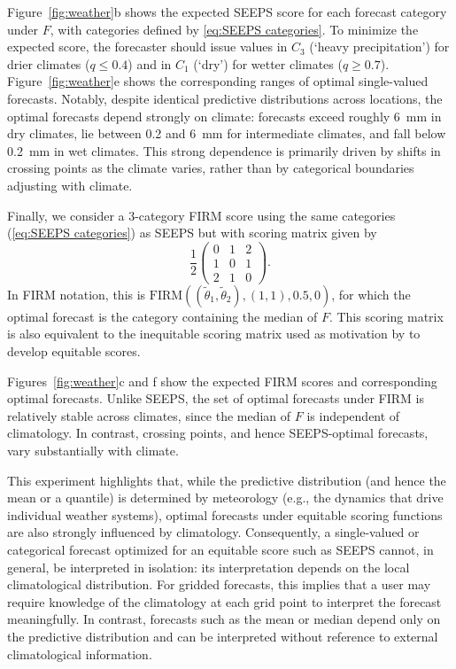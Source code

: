 \documentclass[10pt]{article} %
\theoremstyle{theorem}
\theoremstyle{definition}
\begin{document}
Figure~\ref{fig:weather}b shows the expected SEEPS score for each forecast category under $F$, with categories defined by \eqref{eq:SEEPS categories}. To minimize the expected score, the forecaster should issue values in $C_3$ (`heavy precipitation') for drier climates ($q\leq 0.4$) and in $C_1$ (`dry') for wetter climates ($q\geq0.7$). Figure~\ref{fig:weather}e shows the corresponding ranges of optimal single-valued forecasts. Notably, despite identical predictive distributions across locations, the optimal forecasts depend strongly on climate: forecasts exceed roughly 6~mm in dry climates, lie between 0.2 and 6~mm for intermediate climates, and fall below 0.2~mm in wet climates. This strong dependence is primarily driven by shifts in crossing points as the climate varies, rather than by categorical boundaries adjusting with climate.

Finally, we consider a 3-category FIRM score \citep{taggart2022scoring} using the same categories (\ref{eq:SEEPS categories}) as SEEPS but with scoring matrix given by
\begin{equation}\label{eq:FIRM matrix}
\frac{1}{2}\begin{pmatrix}
0 & 1 & 2 \\
1 & 0 & 1 \\
2 & 1 & 0
\end{pmatrix}.
\end{equation}
In FIRM notation, this is $\mathrm{FIRM}((\tilde{\theta}_1,\tilde{\theta}_2), (1, 1), 0.5, 0)$, for which the optimal forecast is the category containing the median of $F$. This scoring matrix is also equivalent to the inequitable scoring matrix used as motivation by \citet[Section~3]{gandin1992equitable} to develop equitable scores.

Figures~\ref{fig:weather}c and f show the expected FIRM scores and corresponding optimal forecasts. Unlike SEEPS, the set of optimal forecasts under FIRM is relatively stable across climates, since the median of $F$ is independent of climatology. In contrast, crossing points, and hence SEEPS-optimal forecasts, vary substantially with climate.

This experiment highlights that, while the predictive distribution (and hence the mean or a quantile) is determined by meteorology (e.g., the dynamics that drive individual weather systems), optimal forecasts under equitable scoring functions are also strongly influenced by climatology. Consequently, a single-valued or categorical forecast optimized for an equitable score such as SEEPS cannot, in general, be interpreted in isolation: its interpretation depends on the local climatological distribution. For gridded forecasts, this implies that a user may require knowledge of the climatology at each grid point to interpret the forecast meaningfully. In contrast, forecasts such as the mean or median depend only on the predictive distribution and can be interpreted without reference to external climatological information.
\end{document}
